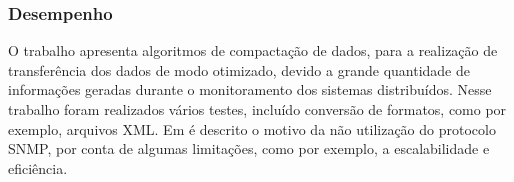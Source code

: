 \subsubsection{Desempenho}

O trabalho \cite{wang2016improvements} apresenta algoritmos de compactação de dados, para a realização de transferência dos dados de modo otimizado, devido a grande quantidade de informações geradas durante o monitoramento dos sistemas distribuídos. Nesse trabalho foram realizados vários testes, incluído conversão de formatos, como por exemplo, arquivos XML. Em \cite{kotsopoulos2008soa} é descrito o motivo da não utilização do protocolo SNMP, por conta de algumas limitações, como por exemplo, a escalabilidade e eficiência. 


